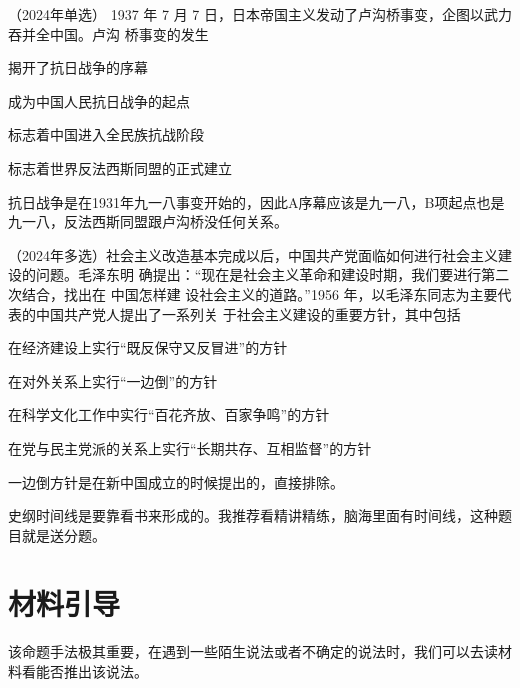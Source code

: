 \documentclass[lang=cn,newtx,10pt,scheme=chinese,pad,twocol]{zznote}
\begin{document}
\begin{example} （2024年单选）	1937 年 7 月 7 日，日本帝国主义发动了卢沟桥事变，企图以武力吞并全中国。卢沟 桥事变的发生
	\begin{choice}
		\item 揭开了抗日战争的序幕
		\item 成为中国人民抗日战争的起点
		\item 标志着中国进入全民族抗战阶段
		\item 标志着世界反法西斯同盟的正式建立
	\end{choice}
\end{example}
\begin{solution}
	抗日战争是在1931年九一八事变开始的，因此A序幕应该是九一八，B项起点也是九一八，反法西斯同盟跟卢沟桥没任何关系。
\end{solution}

\begin{example} （2024年多选）社会主义改造基本完成以后，中国共产党面临如何进行社会主义建设的问题。毛泽东明 确提出：“现在是社会主义革命和建设时期，我们要进行第二次结合，找出在 中国怎样建 设社会主义的道路。”1956 年，以毛泽东同志为主要代表的中国共产党人提出了一系列关 于社会主义建设的重要方针，其中包括
	\begin{choice}
		\item 在经济建设上实行“既反保守又反冒进”的方针
		\item 在对外关系上实行“一边倒”的方针
		\item 在科学文化工作中实行“百花齐放、百家争鸣”的方针
		\item 在党与民主党派的关系上实行“长期共存、互相监督”的方针
	\end{choice}
\end{example}
\begin{solution}
	一边倒方针是在新中国成立的时候提出的，直接排除。
\end{solution}

\begin{postulate}
	史纲时间线是要靠看书来形成的。我推荐看精讲精练，脑海里面有时间线，这种题目就是送分题。
\end{postulate}
\section{材料引导}
\begin{definition}
	该命题手法极其重要，在遇到一些陌生说法或者不确定的说法时，我们可以去读材料看能否推出该说法。
\end{definition}
\end{document}
